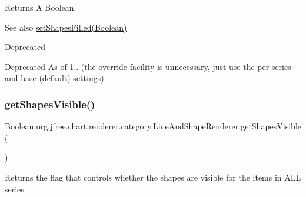 \begin{DoxyReturn}{Returns}
A Boolean.
\end{DoxyReturn}
\begin{DoxySeeAlso}{See also}
\mbox{\hyperlink{classorg_1_1jfree_1_1chart_1_1renderer_1_1category_1_1_line_and_shape_renderer_a63f8d091a4a49eb3b3b7f8646760b7b3}{set\+Shapes\+Filled(\+Boolean)}}
\end{DoxySeeAlso}
\begin{DoxyRefDesc}{Deprecated}
\item[\mbox{\hyperlink{deprecated__deprecated000192}{Deprecated}}]As of 1.. (the override facility is unnecessary, just use the per-\/series and base (default) settings). \end{DoxyRefDesc}
\mbox{\label{classorg_1_1jfree_1_1chart_1_1renderer_1_1category_1_1_line_and_shape_renderer_a1b2c53ae8be56288c260b6da6fec348b}} 
\subsubsection{\texorpdfstring{get\+Shapes\+Visible()}{getShapesVisible()}}
{\footnotesize\ttfamily Boolean org.\+jfree.\+chart.\+renderer.\+category.\+Line\+And\+Shape\+Renderer.\+get\+Shapes\+Visible (\begin{DoxyParamCaption}{ }\end{DoxyParamCaption})}

Returns the flag that controls whether the shapes are visible for the items in A\+LL series.

